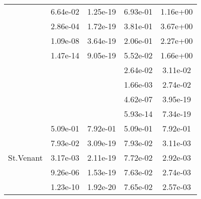 \begin{table}
\begin{tabular}{c|cc|cc|}
\multicolumn{1}{|c|}{} & \multicolumn{1}{|c|}{  6.64e-02} & \multicolumn{1}{|c|}{  1.25e-19} & \multicolumn{1}{|c|}{  6.93e-01} & \multicolumn{1}{|c|}{  1.16e+00} \\ 
\multicolumn{1}{|c|}{} & \multicolumn{1}{|c|}{  2.86e-04} & \multicolumn{1}{|c|}{  1.72e-19} & \multicolumn{1}{|c|}{  3.81e-01} & \multicolumn{1}{|c|}{  3.67e+00} \\ 
\multicolumn{1}{|c|}{} & \multicolumn{1}{|c|}{  1.09e-08} & \multicolumn{1}{|c|}{  3.64e-19} & \multicolumn{1}{|c|}{  2.06e-01} & \multicolumn{1}{|c|}{  2.27e+00} \\ 
\multicolumn{1}{|c|}{} & \multicolumn{1}{|c|}{  1.47e-14} & \multicolumn{1}{|c|}{  9.05e-19} & \multicolumn{1}{|c|}{  5.52e-02} & \multicolumn{1}{|c|}{  1.66e+00} \\ 
\multicolumn{1}{|c|}{} & \multicolumn{1}{|c|}{} & \multicolumn{1}{|c|}{} & \multicolumn{1}{|c|}{  2.64e-02} & \multicolumn{1}{|c|}{  3.11e-02} \\ 
\multicolumn{1}{|c|}{} & \multicolumn{1}{|c|}{} & \multicolumn{1}{|c|}{} & \multicolumn{1}{|c|}{  1.66e-03} & \multicolumn{1}{|c|}{  2.74e-02} \\ 
\multicolumn{1}{|c|}{} & \multicolumn{1}{|c|}{} & \multicolumn{1}{|c|}{} & \multicolumn{1}{|c|}{  4.62e-07} & \multicolumn{1}{|c|}{  3.95e-19} \\ 
\multicolumn{1}{|c|}{} & \multicolumn{1}{|c|}{} & \multicolumn{1}{|c|}{} & \multicolumn{1}{|c|}{  5.93e-14} & \multicolumn{1}{|c|}{  7.34e-19} \\ 
\hline 
\multicolumn{1}{|c|}{\multirow{27}{*}{St.Venant}} &\multicolumn{1}{|c|}{  5.09e-01} & \multicolumn{1}{|c|}{  7.92e-01} & \multicolumn{1}{|c|}{  5.09e-01} & \multicolumn{1}{|c|}{  7.92e-01} \\ 
\multicolumn{1}{|c|}{} & \multicolumn{1}{|c|}{  7.93e-02} & \multicolumn{1}{|c|}{  3.09e-19} & \multicolumn{1}{|c|}{  7.93e-02} & \multicolumn{1}{|c|}{  3.11e-03} \\ 
\multicolumn{1}{|c|}{} & \multicolumn{1}{|c|}{  3.17e-03} & \multicolumn{1}{|c|}{  2.11e-19} & \multicolumn{1}{|c|}{  7.72e-02} & \multicolumn{1}{|c|}{  2.92e-03} \\ 
\multicolumn{1}{|c|}{} & \multicolumn{1}{|c|}{  9.26e-06} & \multicolumn{1}{|c|}{  1.53e-19} & \multicolumn{1}{|c|}{  7.63e-02} & \multicolumn{1}{|c|}{  2.74e-03} \\ 
\multicolumn{1}{|c|}{} & \multicolumn{1}{|c|}{  1.23e-10} & \multicolumn{1}{|c|}{  1.92e-20} & \multicolumn{1}{|c|}{  7.65e-02} & \multicolumn{1}{|c|}{  2.57e-03} \\ 

\end{tabular}
\end{table}
